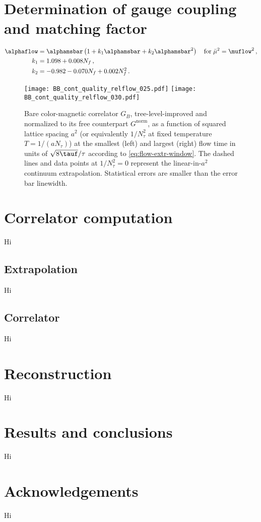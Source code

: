 \documentclass[floatfix,twocolumn,prd,showpacs,preprintnumbers,amsmath,nofootinbib,amssymb,superscriptaddress]{revtex4-2}
\begin{document}
\section{Determination of gauge coupling and matching factor}\label{sec:coupling}

\begin{align}
    \label{harlander}
    \alphaflow & = \alphamsbar
    \left( 1 + k_1 \alphamsbar + k_2 \alphamsbar^2 \right)
    \quad \mbox{for} \; \mubar^2  = \muflow^2 \,,
    \\
    k_1 & = 1.098 + 0.008 N_f \,, \nonumber \\
    k_2 & = -0.982 - 0.070 N_f + 0.002 N_f^2 \,. \nonumber
\end{align}


\begin{figure*}
    \null \hfill
    \texttt{[image: BB\_cont\_quality\_relflow\_025.pdf]}
    \hspace{2.1cm}
    \texttt{[image: BB\_cont\_quality\_relflow\_030.pdf]}
    \hfill \null
    \caption{Bare color-magnetic correlator $G_B$, tree-level-improved and normalized to its free counterpart $G^\text{norm}$, as a function of squared lattice spacing $a^2$ (or equivalently $1/N_\tau^2$ at fixed temperature $T=1/(a N_\tau)$) at the smallest (left) and largest (right) flow time in units of $\sqrt{8\tauf}/\tau$ according to \cref{eq:flow-extr-window}. The dashed lines and data points at $1/N_\tau^2=0$ represent the linear-in-$a^2$ continuum extrapolation. Statistical errors are smaller than the error bar linewidth.}
\label{fig:corr-cont-extrapo}
\end{figure*}

\section{Correlator computation}
\label{sec:extrap}

Hi

\subsection{Extrapolation}

Hi

\subsection{Correlator}

Hi

\section{Reconstruction}
\label{sec:continue}

Hi

\section{Results and conclusions}
\label{sec:results}

Hi

\section*{Acknowledgements}

Hi



\end{document}
